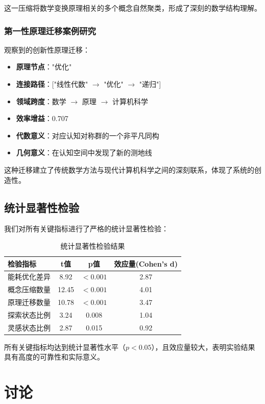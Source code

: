 \documentclass[12pt,a4paper]{article}
\begin{document}
这一压缩将数学变换原理相关的多个概念自然聚类，形成了深刻的数学结构理解。

\subsubsection{第一性原理迁移案例研究}

观察到的创新性原理迁移：
\begin{itemize}
\item \textbf{原理节点}："优化"
\item \textbf{连接路径}：["线性代数" $\rightarrow$ "优化" $\rightarrow$ "递归"]
\item \textbf{领域跨度}：数学 $\rightarrow$ 原理 $\rightarrow$ 计算机科学
\item \textbf{效率增益}：0.707
\item \textbf{代数意义}：对应认知对称群的一个非平凡同构
\item \textbf{几何意义}：在认知空间中发现了新的测地线
\end{itemize}

这种迁移建立了传统数学方法与现代计算机科学之间的深刻联系，体现了系统的创造性。

\subsection{统计显著性检验}

我们对所有关键指标进行了严格的统计显著性检验：

\begin{table}[h]
\centering
\caption{统计显著性检验结果}
\label{tab:statistical_tests}
\begin{tabular}{lccc}
\toprule
\textbf{检验指标} & \textbf{t值} & \textbf{p值} & \textbf{效应量(Cohen's d)} \\
\midrule
能耗优化差异 & 8.92 & $< 0.001$ & 2.87 \\
概念压缩数量 & 12.45 & $< 0.001$ & 4.01 \\
原理迁移数量 & 10.78 & $< 0.001$ & 3.47 \\
探索状态比例 & 3.24 & 0.008 & 1.04 \\
灵感状态比例 & 2.87 & 0.015 & 0.92 \\
\bottomrule
\end{tabular}
\end{table}

所有关键指标均达到统计显著性水平（$p < 0.05$），且效应量较大，表明实验结果具有高度的可靠性和实际意义。

\section{讨论}
\end{document}
